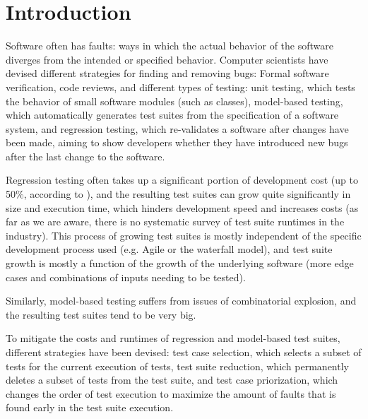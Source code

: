 
\chapter{Introduction}\label{chapter:introduction}

Software often has faults: ways in which the actual behavior of the
software diverges from the intended or specified behavior. Computer
scientists have devised different strategies for finding and removing
bugs: Formal software verification, code reviews, and different types of
testing: unit testing, which tests the behavior of small software modules
(such as classes), model-based testing, which automatically generates
test suites from the specification of a software system, and regression
testing, which re-validates a software after changes have been made,
aiming to show developers whether they have introduced new bugs after
the last change to the software.


Regression testing often takes up a significant portion of development
cost (up to 50\%, according to \cite{ramler2006economic}), and the
resulting test suites can grow quite significantly in size and execution
time, which hinders development speed and increases costs (as far as we
are aware, there is no systematic survey of test suite runtimes in the
industry). This process of growing test suites is mostly independent
of the specific development process used (e.g. Agile or the waterfall
model), and test suite growth is mostly a function of the growth of the
underlying software (more edge cases and combinations of inputs needing
to be tested).

Similarly, model-based testing suffers from issues of combinatorial explosion,
and the resulting test suites tend to be very big.

To mitigate the costs and runtimes of regression and model-based test
suites, different strategies have been devised: test case selection,
which selects a subset of tests for the current execution of tests,
test suite reduction, which permanently deletes a subset of tests from
the test suite, and test case priorization, which changes the order of
test execution to maximize the amount of faults that is found early in
the test suite execution.

